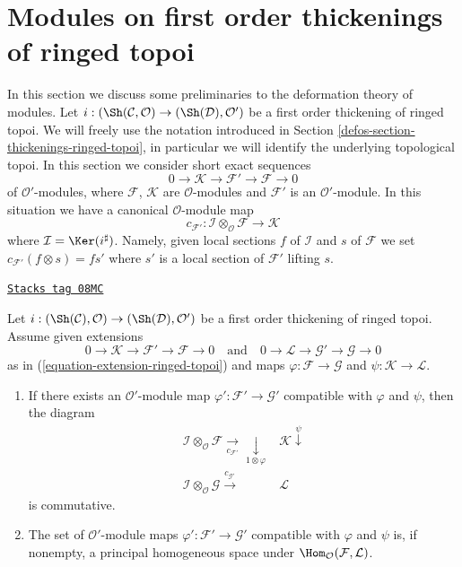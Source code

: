 \section{Modules on first order thickenings of ringed topoi}
\label{defos-section-modules-thickenings-ringed-topoi}
In this section we discuss some preliminaries to the deformation theory
of modules. Let
$i : (\Sh(\mathcal{C}, \mathcal{O}) \to (\Sh(\mathcal{D}), \mathcal{O}')$
be a first order thickening of ringed topoi. We will freely use the notation
introduced in Section \ref{defos-section-thickenings-ringed-topoi},
in particular we will identify the underlying topological topoi.
In this section we consider short exact sequences
\begin{equation}
\label{equation-extension-ringed-topoi}
0 \to \mathcal{K} \to \mathcal{F}' \to \mathcal{F} \to 0
\end{equation}
of $\mathcal{O}'$-modules, where $\mathcal{F}$, $\mathcal{K}$ are
$\mathcal{O}$-modules and $\mathcal{F}'$ is an $\mathcal{O}'$-module.
In this situation we have a canonical $\mathcal{O}$-module map
$$
c_{\mathcal{F}'} :
\mathcal{I} \otimes_\mathcal{O} \mathcal{F}
\longrightarrow
\mathcal{K}
$$
where $\mathcal{I} = \Ker(i^\sharp)$.
Namely, given local sections $f$ of $\mathcal{I}$ and $s$
of $\mathcal{F}$ we set $c_{\mathcal{F}'}(f \otimes s) = fs'$
where $s'$ is a local section of $\mathcal{F}'$ lifting $s$.

\begin{lemma}
\label{defos-lemma-inf-map-ringed-topoi}
\href{https://stacks.math.columbia.edu/tag/08MC}{\texttt{Stacks tag 08MC}}

Let $i : (\Sh(\mathcal{C}), \mathcal{O}) \to (\Sh(\mathcal{D}), \mathcal{O}')$
be a first order thickening of ringed topoi. Assume given
extensions
$$
0 \to \mathcal{K} \to \mathcal{F}' \to \mathcal{F} \to 0
\quad\text{and}\quad
0 \to \mathcal{L} \to \mathcal{G}' \to \mathcal{G} \to 0
$$
as in (\ref{equation-extension-ringed-topoi})
and maps $\varphi : \mathcal{F} \to \mathcal{G}$ and
$\psi : \mathcal{K} \to \mathcal{L}$.
\begin{enumerate}
\item If there exists an $\mathcal{O}'$-module
map $\varphi' : \mathcal{F}' \to \mathcal{G}'$ compatible with $\varphi$
and $\psi$, then the diagram
$$
\begin{array}{cc}\mathcal{I} \otimes_\mathcal{O} \mathcal{F}
\underset{c_{\mathcal{F}'}}{\longrightarrow}\underset{1 \otimes \varphi}{\downarrow} & \mathcal{K} \overset{\psi}{\downarrow} \\ \mathcal{I} \otimes_\mathcal{O} \mathcal{G}
\overset{c_{\mathcal{G}'}}{\longrightarrow} & \mathcal{L}\end{array}
$$
is commutative.
\item The set of $\mathcal{O}'$-module
maps $\varphi' : \mathcal{F}' \to \mathcal{G}'$ compatible with $\varphi$
and $\psi$ is, if nonempty, a principal homogeneous space under
$\Hom_\mathcal{O}(\mathcal{F}, \mathcal{L})$.
\end{enumerate}
\end{lemma}

